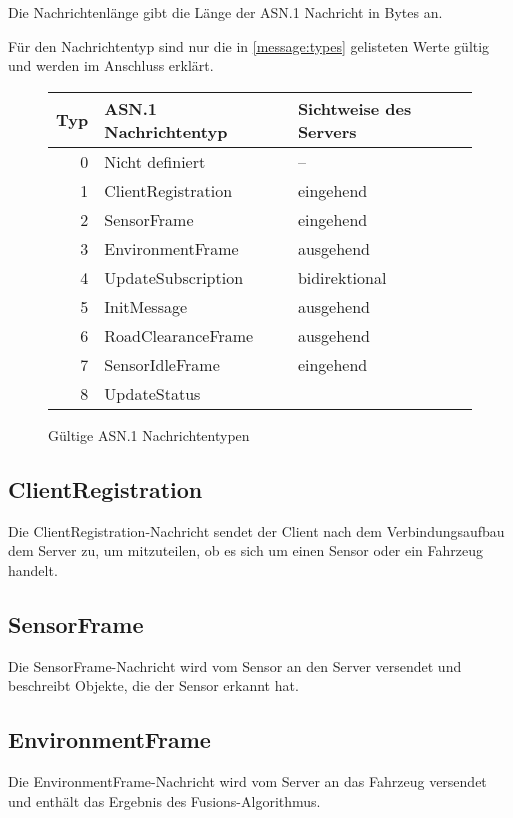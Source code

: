Die Nachrichtenlänge gibt die Länge der ASN.1 Nachricht in Bytes an.

Für den Nachrichtentyp sind nur die in \autoref{message:types} gelisteten Werte gültig und werden im Anschluss erklärt.

\begin{figure}[H]
	\centering
	\begin{tabular}{r|l|l}
		Typ & ASN.1 Nachrichtentyp & Sichtweise des Servers \\
		\hline
		0 & Nicht definiert & -- \\
		1 & ClientRegistration & eingehend \\
		2 & SensorFrame & eingehend \\
		3 & EnvironmentFrame & ausgehend \\
		4 & UpdateSubscription & bidirektional \\
		5 & InitMessage & ausgehend \\
		6 & RoadClearanceFrame & ausgehend \\
		7 & SensorIdleFrame & eingehend \\
		8 & UpdateStatus & \todo{eingehend} \\
	\end{tabular}
	\caption{Gültige ASN.1 Nachrichtentypen}
	\label{message:types}
\end{figure}

\subsection{ClientRegistration}
\label{msg:client_registration}

Die ClientRegistration-Nachricht sendet der Client nach dem Verbindungsaufbau dem Server zu, um mitzuteilen, ob es sich um einen Sensor oder ein Fahrzeug handelt.

\subsection{SensorFrame}
\label{msg:sensor_frame}

Die SensorFrame-Nachricht wird vom Sensor an den Server versendet und beschreibt Objekte, die der Sensor erkannt hat.

\subsection{EnvironmentFrame}
\label{msg:environment_frame}

Die EnvironmentFrame-Nachricht wird vom Server an das Fahrzeug versendet und enthält das Ergebnis des Fusions-Algorithmus.

